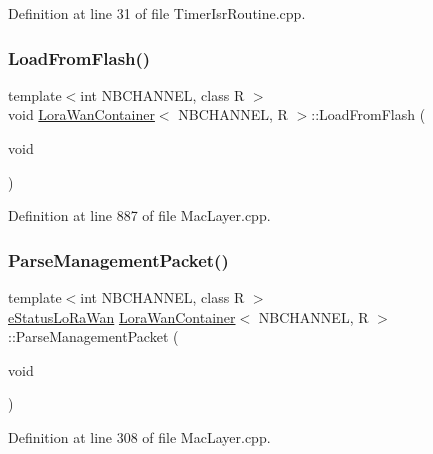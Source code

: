 Definition at line 31 of file Timer\+Isr\+Routine.\+cpp.

\mbox{\label{class_lora_wan_container_abc16aeda3958e34b81e72752e6331be3}} 
\subsubsection{\texorpdfstring{Load\+From\+Flash()}{LoadFromFlash()}}
{\footnotesize\ttfamily template$<$int N\+B\+C\+H\+A\+N\+N\+EL, class R $>$ \\
void \mbox{\hyperlink{class_lora_wan_container}{Lora\+Wan\+Container}}$<$ N\+B\+C\+H\+A\+N\+N\+EL, R $>$\+::Load\+From\+Flash (\begin{DoxyParamCaption}\item[{void}]{ }\end{DoxyParamCaption})}



Definition at line 887 of file Mac\+Layer.\+cpp.

\mbox{\label{class_lora_wan_container_a8b040b7c680d7fa3998a37cb462c74f7}} 
\subsubsection{\texorpdfstring{Parse\+Management\+Packet()}{ParseManagementPacket()}}
{\footnotesize\ttfamily template$<$int N\+B\+C\+H\+A\+N\+N\+EL, class R $>$ \\
\mbox{\hyperlink{_define_8h_a1cea710adbbf5b02bced8f79cd82f7b9}{e\+Status\+Lo\+Ra\+Wan}} \mbox{\hyperlink{class_lora_wan_container}{Lora\+Wan\+Container}}$<$ N\+B\+C\+H\+A\+N\+N\+EL, R $>$\+::Parse\+Management\+Packet (\begin{DoxyParamCaption}\item[{void}]{ }\end{DoxyParamCaption})}



Definition at line 308 of file Mac\+Layer.\+cpp.

\mbox{\label{class_lora_wan_container_a8d38cb16e6bf161520e396457d7194c4}} 
